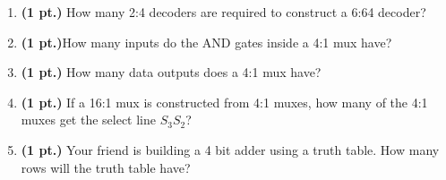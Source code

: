 \documentclass{article}
\begin{document}
\begin{enumerate}
\item {\bf (1 pt.)} How many 2:4 decoders are required to construct a 6:64 decoder?

\item {\bf (1 pt.)}How many inputs do the AND gates inside a 4:1 mux have?

\item {\bf (1 pt.)} How many data outputs does a 4:1 mux have?

\pagebreak{}
\item {\bf (1 pt.)} If a 16:1 mux is constructed from 4:1 muxes, how
many of the 4:1 muxes get the select line $S_3 S_2$?

\item {\bf (1 pt.)} Your friend is building a 4 bit adder using
a truth table.  How many rows will the truth table have?


\end{enumerate}
\end{document}
